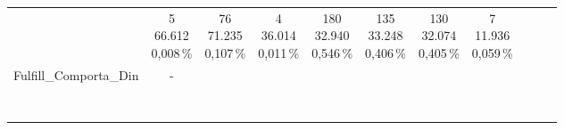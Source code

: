 \begin{table}[H]
{\begin{tabular}{lcccccccccc}
			                     & \shortstack{5                                                                                                                                                             \\ 66.612 \\ 0,008\,\%}
			                     & \shortstack{76                                                                                                                                                            \\ 71.235 \\ 0,107\,\%}
			                     & \shortstack{4                                                                                                                                                             \\ 36.014 \\ 0,011\,\%}
			                     & \shortstack{180                                                                                                                                                           \\ 32.940 \\ 0,546\,\%}
			                     & \shortstack{135                                                                                                                                                           \\ 33.248 \\ 0,406\,\%}
			                     & \shortstack{130                                                                                                                                                           \\ 32.074 \\ 0,405\,\%}
			                     & \shortstack{7                                                                                                                                                             \\ 11.936 \\ 0,059\,\%} \\
			\cmidrule(lr){2-11}
			\shortstack{Fulfill\_Comporta\_Din                                                                                                                                                               \\ \,\\ \, }
			                     & \shortstack{-                                                                                                                                                             \\ \,\\ \, }

\end{tabular}}
\end{table}
